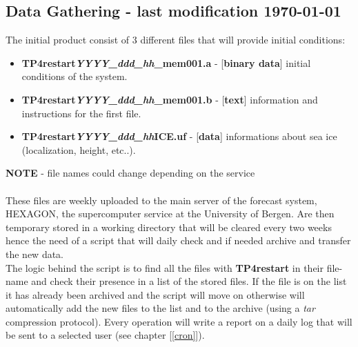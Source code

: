 \documentclass[12pt,a4paper]{report}
\begin{document}
\subsection{Data Gathering - last modification \today}
The initial product consist of 3 different files that will provide initial conditions:
\begin{itemize}
\item \textbf{TP4restart\textit{YYYY\_ddd\_hh}\_mem001.a} - [\textbf{binary data}] initial conditions of the system.
\item \textbf{TP4restart\textit{YYYY\_ddd\_hh}\_mem001.b} - [\textbf{text}] information and instructions for the first file.
\item \textbf{TP4restart\textit{YYYY\_ddd\_hh}ICE.uf} - [\textbf{data}] informations about sea ice (localization, height, etc..).
\end{itemize}
\textbf{NOTE} - file names could change depending on the service \\ \\
These files are weekly uploaded to the main server of the forecast system, HEXAGON, the supercomputer service at the University of Bergen. Are then temporary stored in a working directory that will be cleared every two weeks hence the need of a script that will daily check and if needed archive and transfer the new data. \\
The logic behind the script is to find all the files with \textbf{TP4restart} in their file-name and check their presence in a list of the stored files. If the file is on the list it has already been archived and the script will move on otherwise will automatically add the new files to the list and to the archive (using a \textit{tar} compression protocol). Every operation will write a report on a daily log that will be sent to a selected user (see chapter [\ref{cron}]).

%
%
%

\end{document}
